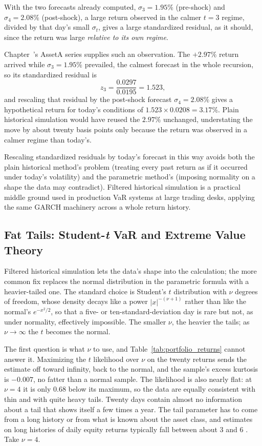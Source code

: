 \documentclass[../ai_in_finance]{subfiles}
\begin{document}
With the two forecasts already computed, $\sigma_3=1.95\%$ (pre-shock) and $\sigma_4=2.08\%$ (post-shock), a large return observed in the calmer $t=3$ regime, divided by that day's small $\sigma_t$, gives a large standardized residual, as it should, since the return was large \emph{relative to its own regime}.

Chapter~'s AssetA series supplies such an observation. The $+2.97\%$ return arrived while $\sigma_3 = 1.95\%$ prevailed, the calmest forecast in the whole recursion, so its standardized residual is
\begin{equation*}
z_3 = \frac{0.0297}{0.0195} = 1.523,
\end{equation*}
and rescaling that residual by the post-shock forecast $\sigma_4 = 2.08\%$ gives a hypothetical return for today's conditions of $1.523 \times 0.0208 = 3.17\%$. Plain historical simulation would have reused the $2.97\%$ unchanged, understating the move by about twenty basis points only because the return was observed in a calmer regime than today's.

Rescaling standardized residuals by today's forecast in this way avoids both the plain historical method's problem (treating every past return as if it occurred under today's volatility) and the parametric method's (imposing normality on a shape the data may contradict). Filtered historical simulation is a practical middle ground used in production VaR systems at large trading desks, applying the same GARCH machinery across a whole return history.

\subsection{Fat Tails: Student-\emph{t} VaR and Extreme Value Theory}
\label{sec:fat-tails}

Filtered historical simulation lets the data's shape into the calculation; the more common fix replaces the normal distribution in the parametric formula with a heavier-tailed one. The standard choice is Student's $t$ distribution with $\nu$ degrees of freedom, whose density decays like a power $|x|^{-(\nu+1)}$ rather than like the normal's $e^{-x^2/2}$, so that a five- or ten-standard-deviation day is rare but not, as under normality, effectively impossible. The smaller $\nu$, the heavier the tails; as $\nu\to\infty$ the $t$ becomes the normal.

The first question is what $\nu$ to use, and Table~\ref{tab:portfolio_returns} cannot answer it. Maximizing the $t$ likelihood over $\nu$ on the twenty returns sends the estimate off toward infinity, back to the normal, and the sample's excess kurtosis is $-0.007$, no fatter than a normal sample. The likelihood is also nearly flat: at $\nu=4$ it is only $0.68$ below its maximum, so the data are equally consistent with thin and with quite heavy tails. Twenty days contain almost no information about a tail that shows itself a few times a year. The tail parameter has to come from a long history or from what is known about the asset class, and estimates on long histories of daily equity returns typically fall between about $3$ and $6$ \parencite{mcneil2015quantitative}. Take $\nu=4$.
\end{document}
